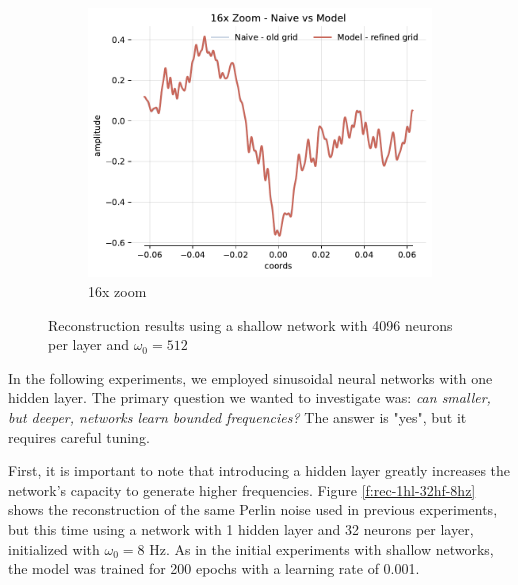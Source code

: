 \begin{figure}[h]
\begin{subfigure}[b]{0.32\textwidth}
        \includegraphics[width=\textwidth]{img/ch4/noise-16x-hf4096-w512.pdf}
        \caption{16x zoom}
    \end{subfigure}
    \caption{Reconstruction results using a shallow network with 4096 neurons per layer and $\omega_0=512$}
    \label{f:full-noise-hf4096-w512}
\end{figure}


In the following experiments, we employed sinusoidal neural networks with one hidden layer. The primary question we wanted to investigate was: \emph{can smaller, but deeper, networks learn bounded frequencies?} The answer is "yes", but it requires careful tuning.

First, it is important to note that introducing a hidden layer greatly increases the network's capacity to generate higher frequencies. Figure \ref{f:rec-1hl-32hf-8hz} shows the reconstruction of the same Perlin noise used in previous experiments, but this time using a network with 1 hidden layer and 32 neurons per layer, initialized with $\omega_0=8$ Hz. As in the initial experiments with shallow networks, the model was trained for 200 epochs with a learning rate of 0.001.

